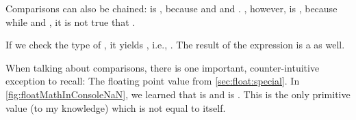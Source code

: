 Comparisons can also be chained:
 is , because  and  and .
, however, is , because while  and , it is not true that .

If we check the type of , it yields , i.e., .
The result of the expression  is a  as well.

When talking about comparisons, there is one important, counter-intuitive exception to recall:
The  floating point value from \cref{sec:float:special}.
In \cref{fig:floatMathInConsoleNaN}, we learned that \pythonIdx{==} is  and  is .
This is the only primitive value (to my knowledge) which is not equal to itself.%
\endhsection%
%
%
%
%
